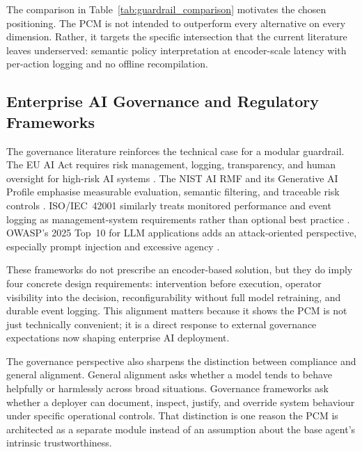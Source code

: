 \documentclass[12pt,a4paper]{article}
\begin{document}
The comparison in Table~\ref{tab:guardrail_comparison} motivates the chosen
positioning. The PCM is not intended to outperform every alternative on every
dimension. Rather, it targets the specific intersection that the current
literature leaves underserved: semantic policy interpretation at encoder-scale
latency with per-action logging and no offline recompilation.

\subsection{Enterprise AI Governance and Regulatory Frameworks}

The governance literature reinforces the technical case for a modular guardrail.
The EU AI Act requires risk management, logging, transparency, and human
oversight for high-risk AI systems \citep{euaiact2024}. The NIST AI RMF and its
Generative AI Profile emphasise measurable evaluation, semantic filtering, and
traceable risk controls \citep{nist2023rmf,autio2024nist}. ISO/IEC~42001
similarly treats monitored performance and event logging as management-system
requirements rather than optional best practice \citep{iso2023}. OWASP's 2025
Top~10 for LLM applications adds an attack-oriented perspective, especially
prompt injection and excessive agency \citep{owasp2025llm}.

These frameworks do not prescribe an encoder-based solution, but they do imply
four concrete design requirements: intervention before execution, operator
visibility into the decision, reconfigurability without full model retraining,
and durable event logging. This alignment matters because it shows the PCM is
not just technically convenient; it is a direct response to external governance
expectations now shaping enterprise AI deployment.

The governance perspective also sharpens the distinction between compliance and
general alignment. General alignment asks whether a model tends to behave
helpfully or harmlessly across broad situations. Governance frameworks ask
whether a deployer can document, inspect, justify, and override system behaviour
under specific operational controls. That distinction is one reason the PCM is
architected as a separate module instead of an assumption about the base agent's
intrinsic trustworthiness.

\end{document}
